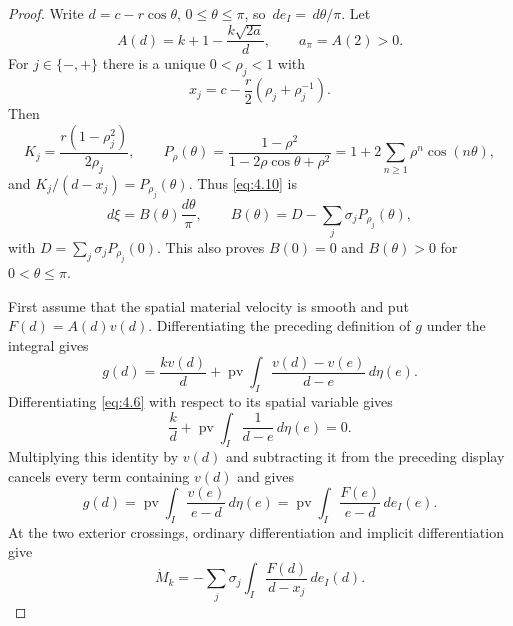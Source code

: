 \documentclass[11pt]{article}
\numberwithin{equation}{section}
\theoremstyle{plain}
\theoremstyle{definition}
\theoremstyle{remark}
\newcommand{\1}{\mathbf 1}
\newcommand{\dd}{\,d}
\newcommand{\pv}{\operatorname {pv}}
\begin{document}
\begin{proof}
Write $d=c-r\cos\theta$, $0\le\theta\le\pi$, so
$\dd e_I=\dd\theta/\pi$.
Let
\[
 A(d)=k+1-\frac{k\sqrt{2a}}d,\qquad a_\pi=A(2)>0.
\]
For $j\in\{-,+\}$ there is a unique $0<\rho_j<1$ with
\[
 x_j=c-\frac r2(\rho_j+\rho_j^{-1}).
\]
Then
\[
 K_j=\frac{r(1-\rho_j^2)}{2\rho_j},\qquad
 P_\rho(\theta)=\frac{1-\rho^2}{1-2\rho\cos\theta+\rho^2}
 =1+2\sum_{n\ge1}\rho^n\cos(n\theta),
\]
and $K_j/(d-x_j)=P_{\rho_j}(\theta)$.  Thus \eqref{eq:4.10} is
\begin{equation}
 d\xi=B(\theta)\frac{d\theta}{\pi},\qquad
 B(\theta)=D-\sum_j\sigma_jP_{\rho_j}(\theta),
\label{eq:4.18}
\end{equation}
with $D=\sum_j\sigma_jP_{\rho_j}(0)$.  This also proves $B(0)=0$ and
$B(\theta)>0$ for $0<\theta\le\pi$.

First assume that the spatial material velocity is smooth and put
$F(d)=A(d)v(d)$.  Differentiating the preceding definition of $g$ under
the integral gives
\[
 g(d)=\frac{k v(d)}d+\pv\int_I
 \frac{v(d)-v(e)}{d-e}\dd\eta(e).
\]
Differentiating \eqref{eq:4.6} with respect to its spatial variable gives
\[
 \frac kd+\pv\int_I\frac1{d-e}\dd\eta(e)=0.
\]
Multiplying this identity by $v(d)$ and subtracting it from the preceding
display cancels every term containing $v(d)$ and gives
\[
 g(d)=\pv\int_I\frac{v(e)}{e-d}\dd\eta(e)
     =\pv\int_I\frac{F(e)}{e-d}\dd e_I(e).
\]
At the two exterior crossings, ordinary differentiation and implicit
differentiation give
\[
 \dot M_k=-\sum_j\sigma_j\int_I\frac{F(d)}{d-x_j}\dd e_I(d).
\]


\end{proof}
\end{document}
